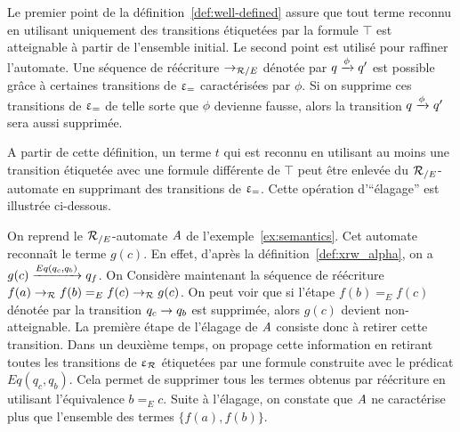 \noindent
Le premier point de la définition~\ref{def:well-defined} assure que
tout terme reconnu en utilisant uniquement des transitions étiquetées
par la formule $\top$ est atteignable à partir de l'ensemble initial.
Le second point est utilisé pour raffiner l'automate. Une séquence de réécriture
$\rightarrow_{\mathcal R/E}$ dénotée par $q \xrightarrow{\phi} q'$ est possible grâce à certaines transitions
de $\upvarepsilon_{=}$ caractérisées par $\phi$. Si on supprime ces transitions de $\upvarepsilon_{=}$ de telle sorte
que $\phi$ devienne fausse, alors la transition $q \xrightarrow{\phi} q'$ sera aussi supprimée.

A partir de cette définition, un terme $t$ qui est reconnu en 
utilisant au moins une transition étiquetée avec une formule différente de $\top$
peut être enlevée du ${\mathcal R_{/E}}$-automate en supprimant des transitions de $\upvarepsilon_{=}$.
Cette opération d'``élagage''  est illustrée ci-dessous.

\begin{example}
  \label{ex:pruning}
  On reprend le ${\mathcal R_{/E}}$-automate $\mathit A$ de l'exemple~\ref{ex:semantics}.
  Cet automate reconnaît le terme $g(c)$. En effet, d'après la
  définition~\ref{def:xrw_alpha}, on a $g(c) \xrightarrow{Eq(q_c, q_b)}
  q_f$. On Considère maintenant la séquence de réécriture $f(a) \rightarrow_\mathcal R f(b) =_E f(c) 
  \rightarrow_\mathcal R g(c)$. On peut voir que si l'étape $f(b) =_E f(c)$ dénotée par la 
  transition $q_c \rightarrow q_b$ est supprimée, alors $g(c)$ devient non-atteignable. 
  La première étape de l'élagage de $\mathit A$ consiste donc à retirer cette
  transition. Dans un deuxième temps, on propage cette information en retirant
  toutes les transitions de $\upvarepsilon_{\mathcal R}$ étiquetées par une formule construite avec le prédicat $Eq(q_c, q_b)$.
  Cela permet de supprimer tous les termes obtenus par réécriture en utilisant l'équivalence $b =_E c$.
  Suite à l'élagage, on constate que $\mathit A$ ne caractérise plus que l'ensemble des termes $\{f(a), f(b)\}$.
\end{example}





